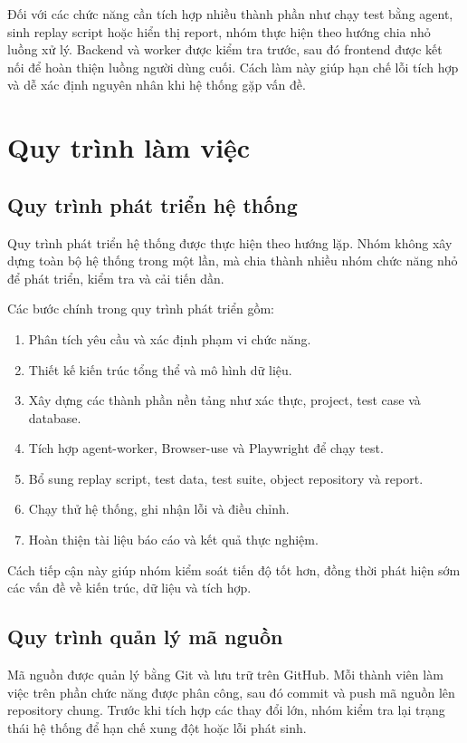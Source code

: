 Đối với các chức năng cần tích hợp nhiều thành phần như chạy test bằng agent, sinh replay script hoặc hiển thị report, nhóm thực hiện theo hướng chia nhỏ luồng xử lý. Backend và worker được kiểm tra trước, sau đó frontend được kết nối để hoàn thiện luồng người dùng cuối. Cách làm này giúp hạn chế lỗi tích hợp và dễ xác định nguyên nhân khi hệ thống gặp vấn đề.

\section{Quy trình làm việc}

\subsection{Quy trình phát triển hệ thống}

Quy trình phát triển hệ thống được thực hiện theo hướng lặp. Nhóm không xây dựng toàn bộ hệ thống trong một lần, mà chia thành nhiều nhóm chức năng nhỏ để phát triển, kiểm tra và cải tiến dần.

Các bước chính trong quy trình phát triển gồm:

\begin{enumerate}
    \item Phân tích yêu cầu và xác định phạm vi chức năng.
    \item Thiết kế kiến trúc tổng thể và mô hình dữ liệu.
    \item Xây dựng các thành phần nền tảng như xác thực, project, test case và database.
    \item Tích hợp agent-worker, Browser-use và Playwright để chạy test.
    \item Bổ sung replay script, test data, test suite, object repository và report.
    \item Chạy thử hệ thống, ghi nhận lỗi và điều chỉnh.
    \item Hoàn thiện tài liệu báo cáo và kết quả thực nghiệm.
\end{enumerate}

Cách tiếp cận này giúp nhóm kiểm soát tiến độ tốt hơn, đồng thời phát hiện sớm các vấn đề về kiến trúc, dữ liệu và tích hợp.

\subsection{Quy trình quản lý mã nguồn}

Mã nguồn được quản lý bằng Git và lưu trữ trên GitHub. Mỗi thành viên làm việc trên phần chức năng được phân công, sau đó commit và push mã nguồn lên repository chung. Trước khi tích hợp các thay đổi lớn, nhóm kiểm tra lại trạng thái hệ thống để hạn chế xung đột hoặc lỗi phát sinh.

